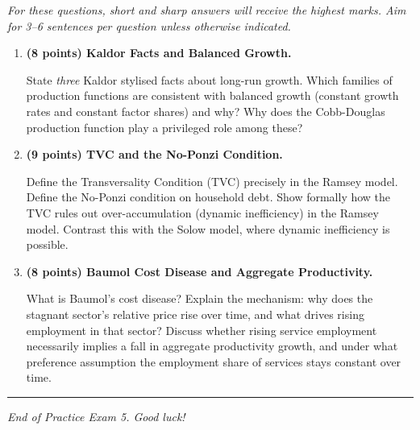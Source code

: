 \documentclass[a4paper,11pt]{article}
\begin{document}
\noindent\textit{For these questions, short and sharp answers will receive the highest marks.
Aim for 3--6 sentences per question unless otherwise indicated.}

\vspace{8pt}

\begin{enumerate}[label=\textbf{\arabic*.}, leftmargin=*, itemsep=14pt]

    \item \textbf{(8 points) Kaldor Facts and Balanced Growth.}

    State \emph{three} Kaldor stylised facts about long-run growth. Which families of
    production functions are consistent with balanced growth (constant growth rates and
    constant factor shares) and why? Why does the Cobb-Douglas production function play a
    privileged role among these?

    \item \textbf{(9 points) TVC and the No-Ponzi Condition.}

    Define the Transversality Condition (TVC) precisely in the Ramsey model. Define the
    No-Ponzi condition on household debt. Show formally how the TVC rules out
    over-accumulation (dynamic inefficiency) in the Ramsey model. Contrast this with the
    Solow model, where dynamic inefficiency is possible.

    \item \textbf{(8 points) Baumol Cost Disease and Aggregate Productivity.}

    What is Baumol's cost disease? Explain the mechanism: why does the stagnant sector's
    relative price rise over time, and what drives rising employment in that sector?
    Discuss whether rising service employment necessarily implies a fall in aggregate
    productivity growth, and under what preference assumption the employment share of
    services stays constant over time.

\end{enumerate}

\vspace{20pt}
\noindent\rule{\textwidth}{0.4pt}

\begin{center}
    \textit{End of Practice Exam 5. Good luck!}
\end{center}
\end{document}
